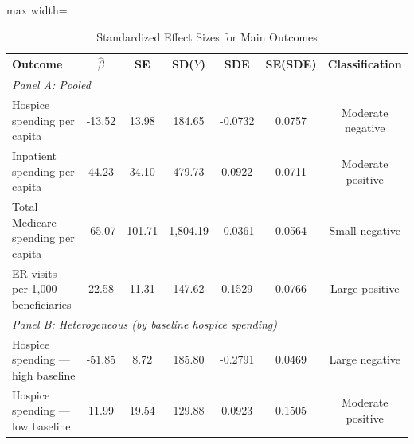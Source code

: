 \begin{table}[H]
\centering
\caption{Standardized Effect Sizes for Main Outcomes}
\label{tab:sde}
\begin{adjustbox}{max width=\textwidth}
\begin{threeparttable}
\begin{tabular}{lcccccc}
\toprule
Outcome & $\hat{\beta}$ & SE & SD($Y$) & SDE & SE(SDE) & Classification \\
\midrule
\multicolumn{7}{l}{\textit{Panel A: Pooled}} \\
Hospice spending per capita & -13.52 & 13.98 & 184.65 & -0.0732 & 0.0757 & Moderate negative \\
Inpatient spending per capita & 44.23 & 34.10 & 479.73 & 0.0922 & 0.0711 & Moderate positive \\
Total Medicare spending per capita & -65.07 & 101.71 & 1,804.19 & -0.0361 & 0.0564 & Small negative \\
ER visits per 1,000 beneficiaries & 22.58 & 11.31 & 147.62 & 0.1529 & 0.0766 & Large positive \\
\midrule
\multicolumn{7}{l}{\textit{Panel B: Heterogeneous (by baseline hospice spending)}} \\
Hospice spending --- high baseline & -51.85 & 8.72 & 185.80 & -0.2791 & 0.0469 & Large negative \\
Hospice spending --- low baseline & 11.99 & 19.54 & 129.88 & 0.0923 & 0.1505 & Moderate positive \\
\bottomrule
\end{tabular}
\begin{tablenotes}[flushleft]
\scriptsize

\end{tablenotes}
\end{threeparttable}
\end{adjustbox}
\end{table}
